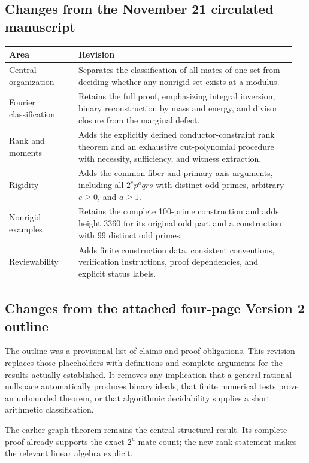 \documentclass[10pt]{article}
\begin{document}
\subsection*{Changes from the November 21 circulated manuscript}

\begin{tabular}{@{}p{0.23\linewidth}p{0.72\linewidth}@{}}
\toprule
Area & Revision\\
\midrule
Central organization & Separates the classification of all mates of one set from deciding whether any nonrigid set exists at a modulus.\\
Fourier classification & Retains the full proof, emphasizing integral inversion, binary reconstruction by mass and energy, and divisor closure from the marginal defect.\\
Rank and moments & Adds the explicitly defined conductor-constraint rank theorem and an exhaustive cut-polynomial procedure with necessity, sufficiency, and witness extraction.\\
Rigidity & Adds the common-fiber and primary-axis arguments, including all $2^e p^a qrs$ with distinct odd primes, arbitrary $e\geq0$, and $a\geq1$.\\
Nonrigid examples & Retains the complete 100-prime construction and adds height 3360 for its original odd part and a construction with 99 distinct odd primes.\\
Reviewability & Adds finite construction data, consistent conventions, verification instructions, proof dependencies, and explicit status labels.\\
\bottomrule
\end{tabular}

\subsection*{Changes from the attached four-page Version 2 outline}

The outline was a provisional list of claims and proof obligations. This revision replaces those placeholders with definitions and complete arguments for the results actually established. It removes any implication that a general rational nullspace automatically produces binary ideals, that finite numerical tests prove an unbounded theorem, or that algorithmic decidability supplies a short arithmetic classification.

The earlier graph theorem remains the central structural result. Its complete proof already supports the exact $2^u$ mate count; the new rank statement makes the relevant linear algebra explicit.
\end{document}
